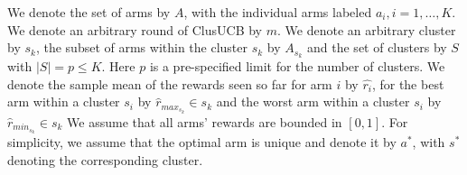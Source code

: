 We denote the set of arms by $A$, with the individual arms labeled $a_i, i=1,\ldots,K$.
We denote an arbitrary round of ClusUCB by $m$. We denote an arbitrary cluster by $s_{k}$, the subset of arms within the cluster $s_k$ by  $A_{s_{k}}$  and the set of clusters by $S$ with $|S|=p\leq K$. Here $p$ is a pre-specified limit for the number of clusters. 
We denote the sample mean of the rewards seen so far for arm $i$ by $\hat{r_i}$, for the best arm within a cluster $s_i$ by $\hat{r}_{max_{s_{k}}}\in s_{k}$ and the worst arm within a cluster $s_i$ by $\hat{r}_{min_{s_{k}}}\in s_{k}$ 
We assume that all arms' rewards are bounded in $[0,1]$. For simplicity, we assume that the optimal arm is unique and denote it by $a^{*}$, with $s^{*}$ denoting the corresponding cluster.
